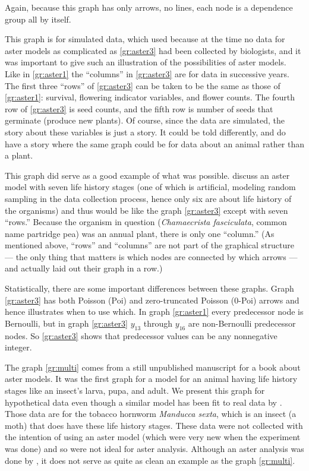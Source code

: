 Again, because this graph has only arrows, no lines, each node is
a dependence group all by itself.

This graph is for simulated data, which \citet{aster3} used because
at the time no data for aster models as complicated as \eqref{gr:aster3} had
been collected by biologists, and it was important to give such
an illustration of the possibilities of aster models.
Like in \eqref{gr:aster1} the ``columns'' in \eqref{gr:aster3} are for
data in successive years.  The first three ``rows'' of \eqref{gr:aster3}
can be taken to be the same as those of \eqref{gr:aster1}: survival,
flowering indicator variables, and flower counts.  The fourth row of
\eqref{gr:aster3} is seed counts, and the fifth row is number of seeds
that germinate (produce new plants).  Of course, since the data
are simulated, the story about these variables is just a story.
It could be told differently, and \citet{aster3} do have a story
where the same graph could be for data about an animal rather than a plant.

This graph did serve as a good example of what was possible.
\citet*[in the on-line appendix]{stanton-geddes-tiffin-shaw}
discuss an aster model with seven life history stages (one of which is
artificial, modeling random sampling in the data collection process, hence
only six are about life history of the organisms) and thus would be
like the graph \eqref{gr:aster3} except with seven ``rows.''
Because the organism in question (\emph{Chamaecrista fasciculata}, common
name partridge pea) was an annual plant, there is only one ``column.''
(As mentioned above, ``rows'' and ``columns'' are not part of the graphical
structure --- the only thing that matters is which nodes are connected
by which arrows --- and \citeauthor{stanton-geddes-tiffin-shaw} actually
laid out their graph in a row.)

Statistically, there are some important differences between these graphs.
Graph \eqref{gr:aster3} has both Poisson (Poi) and zero-truncated Poisson
(0-Poi) arrows and hence illustrates when to use which.
In graph \eqref{gr:aster1} every predecessor node is Bernoulli,
but in graph \eqref{gr:aster3} $y_{13}$ through $y_{16}$ are non-Bernoulli
predecessor nodes.  So \eqref{gr:aster3} shows that predecessor values can
be any nonnegative integer.

The graph \eqref{gr:multi} comes from a still unpublished manuscript for a book
about aster models.  It was the first graph for a model for an animal having
life history stages like an insect's larva, pupa, and adult.  We present this
graph for hypothetical data even though a similar model has been fit to real
data by \citet{aster-hornworm}.  Those data are for the tobacco hornworm
\emph{Manducca sexta}, which is an insect (a moth) that does have these life
history stages.  These data were not collected with the intention of using
an aster model (which were very new when the experiment was done) and so were
not ideal for aster analysis.  Although an aster analysis was done by
\citet{aster-hornworm}, it does not serve as quite as clean an example as
the graph \eqref{gr:multi}.

